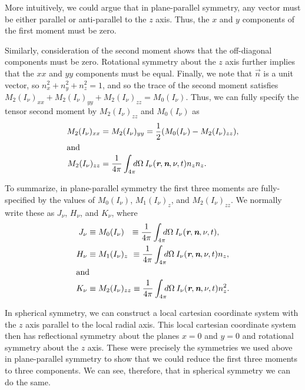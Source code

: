 More intuitively, we could argue that in plane-parallel symmetry, any vector must be either parallel or anti-parallel to the $z$ axis. Thus, the $x$ and $y$ components of the first moment must be zero.

\newslide

Similarly, consideration of the second moment shows that the
off-diagonal components must be zero. Rotational symmetry about the $z$ axis further implies  that the $xx$ and $yy$
components must be equal. Finally, we note that $\vec n$ is a unit
vector, so $n_x^2 + n_y^2 + n_z^2 = 1$, and so the trace of the second
moment satisfies $M_2(I_\nu)_{xx} + M_2(I_\nu)_{yy} + M_2(I_\nu)_{zz} =
M_0(I_\nu)$. Thus, we can fully specify the tensor second moment by
$M_2(I_\nu)_{zz}$ and $M_0(I_\nu)$ as
\begin{align}
M_2(I_\nu)_{xx} &= 
M_2(I_\nu)_{yy} = \frac{1}{2}(M_0(I_\nu) - M_2(I_\nu)_{zz}),\\
\intertext{and}
M_2(I_\nu)_{zz} &= \frac{1}{4\pi} \int_{4\pi}\!\!\!d\Omega\:
I_\nu(\vec r, \vec n, \nu, t) n_z n_z.
\end{align}

\newslide

To summarize, in plane-parallel symmetry the first three moments
are fully-specified by the values of $M_0(I_\nu)$, $M_1(I_\nu)_z$, and
$M_2(I_\nu)_{zz}$. We normally write these as $J_\nu$, $H_\nu$, and
$K_\nu$, where
\begin{align}
J_\nu &\equiv M_0(I_\nu)_{\phantom{ij}}
\equiv 
\frac{1}{4\pi} \int_{4\pi}\!\!\!d\Omega\:
I_\nu(\vec r, \vec n, \nu, t),\\
H_\nu &\equiv M_1(I_\nu)_{z\phantom{j}}
\equiv 
\frac{1}{4\pi} \int_{4\pi}\!\!\!d\Omega\:
I_\nu(\vec r, \vec n, \nu, t) n_z,\\
\intertext{and}
K_\nu &\equiv M_2(I_\nu)_{zz}
\equiv 
\frac{1}{4\pi} 
\int_{4\pi}\!\!\!d\Omega\:
I_\nu(\vec r, \vec n, \nu, t) n_z^2.
\end{align}

\newslide

In spherical symmetry, we can construct a local cartesian coordinate system with the $z$ axis parallel to the local radial axis. This local cartesian coordinate system then has reflectional symmetry about the planes $x = 0$ and $y = 0$ and rotational symmetry about the $z$ axis. These were precisely the symmetries we used above in plane-parallel symmetry to show that we could reduce the first three moments to three components. We can see, therefore, that in spherical symmetry we can do the same.

